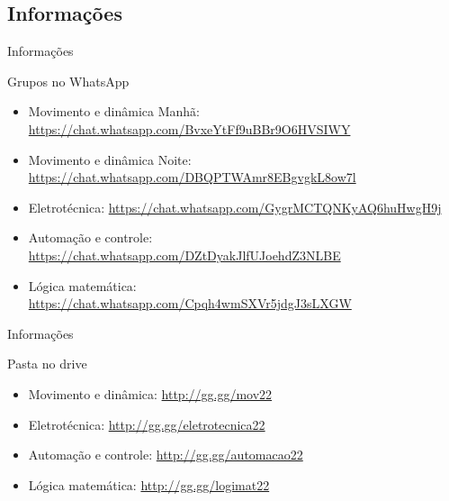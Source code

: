 \documentclass{beamer}
\begin{document}
\subsection{Informações}
%
\begin{frame}{Informações}
    \begin{block}{Grupos no WhatsApp}
        \begin{itemize}
            \item Movimento e dinâmica Manhã: \url{https://chat.whatsapp.com/BvxeYtFf9uBBr9O6HVSIWY}
            \item Movimento e dinâmica Noite: \url{https://chat.whatsapp.com/DBQPTWAmr8EBgvgkL8ow7l}
            \item Eletrotécnica: \url{https://chat.whatsapp.com/GygrMCTQNKyAQ6huHwgH9j}
            \item Automação e controle: \url{https://chat.whatsapp.com/DZtDyakJlfUJoehdZ3NLBE}
            \item Lógica matemática: \url{https://chat.whatsapp.com/Cpqh4wmSXVr5jdgJ3sLXGW}
        \end{itemize}        
    \end{block}
\end{frame}
%
\begin{frame}{Informações}
    \begin{block}{Pasta no drive}
        \begin{itemize}
            \item Movimento e dinâmica: \url{http://gg.gg/mov22}
            \item Eletrotécnica: \url{http://gg.gg/eletrotecnica22}
            \item Automação e controle: \url{http://gg.gg/automacao22}
            \item Lógica matemática: \url{http://gg.gg/logimat22}
        \end{itemize}
    \end{block}
\end{frame}
%
\end{document}
